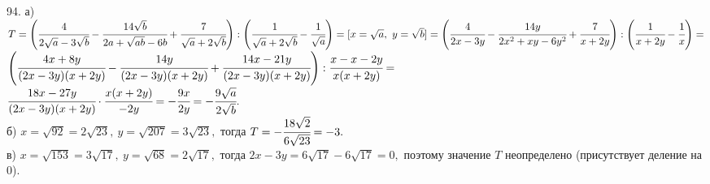 94. а) $T=\left(\cfrac{4}{2\sqrt{a}-3\sqrt{b}}-\cfrac{14\sqrt{b}}{2a+\sqrt{ab}-6b}+\cfrac{7}{\sqrt{a}+2\sqrt{b}}\right):\left(\cfrac{1}{\sqrt{a}+2\sqrt{b}}-\cfrac{1}{\sqrt{a}}\right)=
[x=\sqrt{a},\ y=\sqrt{b}]=
\left(\cfrac{4}{2x-3y}-\cfrac{14y}{2x^2+xy-6y^2}+\cfrac{7}{x+2y}\right):\left(\cfrac{1}{x+2y}-\cfrac{1}{x}\right)=$\\$
\left(\cfrac{4x+8y}{(2x-3y)(x+2y)}-\cfrac{14y}{(2x-3y)(x+2y)}+\cfrac{14x-21y}{(2x-3y)(x+2y)}\right):\cfrac{x-x-2y}{x(x+2y)}=$\\$
\cfrac{18x-27y}{(2x-3y)(x+2y)}\cdot\cfrac{x(x+2y)}{-2y}=-\cfrac{9x}{2y}=-\cfrac{9\sqrt{a}}{2\sqrt{b}}.$\\
б) $x=\sqrt{92}=2\sqrt{23},\ y=\sqrt{207}=3\sqrt{23},$ тогда $T=-\cfrac{18\sqrt{2}}{6\sqrt{23}}=-3.$\\
в) $x=\sqrt{153}=3\sqrt{17},\ y=\sqrt{68}=2\sqrt{17},$ тогда $2x-3y=6\sqrt{17}-6\sqrt{17}=0,$ поэтому значение $T$ неопределено (присутствует деление на 0).\\
